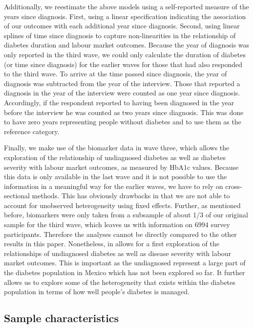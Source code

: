 Additionally, we reestimate the above models using a self-reported
measure of the years since diagnosis. First, using a linear specification
indicating the association of our outcomes with each additional year
since diagnosis. Second, using linear splines of time since diagnosis
to capture non-linearities in the relationship of diabetes duration
and labour market outcomes. Because the year of diagnosis was only
reported in the third wave, we could only calculate the duration of
diabetes (or time since diagnosis) for the earlier waves for those
that had also responded to the third wave. To arrive at the time passed
since diagnosis, the year of diagnosis was subtracted from the year
of the interview. Those that reported a diagnosis in the year of the
interview were counted as one year since diagnosis. Accordingly, if
the respondent reported to having been diagnosed in the year before
the interview he was counted as two years since diagnosis. This was
done to have zero years representing people without diabetes and to
use them as the reference category.

Finally, we make use of the biomarker data in wave three, which allows
the exploration of the relationship of undiagnosed diabetes as well
as diabetes severity with labour market outcomes, as measured by \ac{HbA1c}
values. Because this data is only available in the last wave and it
is not possible to use the information in a meaningful way for the
earlier waves, we have to rely on cross-sectional methods. This has
obviously drawbacks in that we are not able to account for unobserved
heterogeneity using fixed effects. Further, as mentioned before, biomarkers
were only taken from a subsample of about 1/3 of our original sample
for the third wave, which leaves us with information on 6994 survey
participants. Therefore the analyses cannot be directly compared to
the other results in this paper. Nonetheless, in allows for a first
exploration of the relationships of undiagnosed diabetes as well as
disease severity with labour market outcomes. This is important as
the undiagnosed represent a large part of the diabetes population
in Mexico which has not been explored so far. It further allows us
to explore some of the heterogeneity that exists within the diabetes
population in terms of how well people's diabetes is managed.


\subsection{Sample characteristics}

